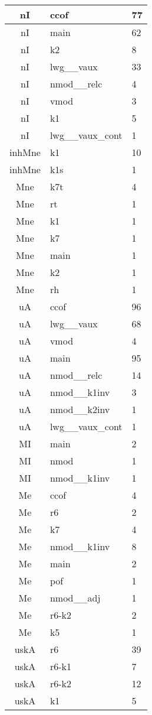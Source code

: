 \documentclass[a4 paper]{article}
\begin{document}
\begin{longtable}{cp{}p{}}
nI & ccof & 77\\ \midrule nI & main & 62\\ \midrule nI & k2 & 8\\ \midrule nI & lwg\_\_vaux & 33\\ \midrule nI & nmod\_\_relc & 4\\ \midrule nI & vmod & 3\\ \midrule nI & k1 & 5\\ \midrule nI & lwg\_\_vaux\_cont & 1\\ \midrule 
inhMne & k1 & 10\\ \midrule inhMne & k1s & 1\\ \midrule 
Mne & k7t & 4\\ \midrule Mne & rt & 1\\ \midrule Mne & k1 & 1\\ \midrule Mne & k7 & 1\\ \midrule Mne & main & 1\\ \midrule Mne & k2 & 1\\ \midrule Mne & rh & 1\\ \midrule 
uA & ccof & 96\\ \midrule uA & lwg\_\_vaux & 68\\ \midrule uA & vmod & 4\\ \midrule uA & main & 95\\ \midrule uA & nmod\_\_relc & 14\\ \midrule uA & nmod\_\_k1inv & 3\\ \midrule uA & nmod\_\_k2inv & 1\\ \midrule uA & lwg\_\_vaux\_cont & 1\\ \midrule 
MI & main & 2\\ \midrule MI & nmod & 1\\ \midrule MI & nmod\_\_k1inv & 1\\ \midrule 
Me & ccof & 4\\ \midrule Me & r6 & 2\\ \midrule Me & k7 & 4\\ \midrule Me & nmod\_\_k1inv & 8\\ \midrule Me & main & 2\\ \midrule Me & pof & 1\\ \midrule Me & nmod\_\_adj & 1\\ \midrule Me & r6-k2 & 2\\ \midrule Me & k5 & 1\\ \midrule 
uskA & r6 & 39\\ \midrule uskA & r6-k1 & 7\\ \midrule uskA & r6-k2 & 12\\ \midrule uskA & k1 & 5\\ \midrule 

\end{longtable}
\end{document}
